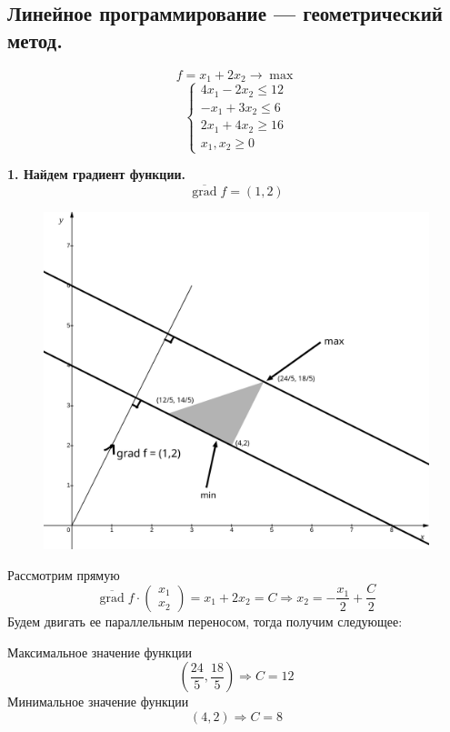 \subsection{Линейное программирование --- геометрический метод.}
\begin{example}
	\begin{equation*}
		f=x_1+2x_2 \to \max
	\end{equation*}
	\begin{equation*}
		\begin{cases}
			4x_1-2x_2\leq12\\
			-x_1+3x_2\leq6\\
			2x_1+4x_2\geq16\\
			x_1,x_2\geq0
		\end{cases}
	\end{equation*}
	\begin{solution}
		\textbf{1. Найдем градиент функции.}
		\begin{equation*}
			\overline{\operatorname{grad}}f=(1,2)
		\end{equation*}
		\begin{figure}[H]
			\centering
			\includegraphics[width=0.7\linewidth]{img/prac4}
			\caption{}
			\label{fig:prac4}
		\end{figure}
		Рассмотрим прямую
		\begin{equation*}
			\overline{\operatorname{grad}}f\cdot\left(\begin{matrix}
				x_1\\
				x_2
			\end{matrix}\right) = x_1 + 2x_2 = C \Rightarrow x_2=-\frac{x_1}{2} + \frac{C}{2}
		\end{equation*}
		Будем двигать ее параллельным переносом, тогда получим следующее:
		
		Максимальное значение функции
		\begin{equation*}
			(\dfrac{24}{5},\dfrac{18}{5})\Rightarrow \boxed{C=12}
		\end{equation*}
		Минимальное значение функции
		\begin{equation*}
			(4, 2)\Rightarrow \boxed{C=8}
		\end{equation*}
	\end{solution}
\end{example}